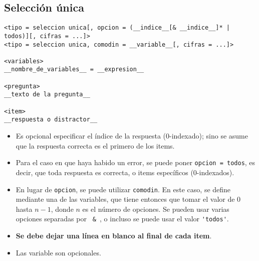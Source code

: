 \documentclass[12pt]{article}
\theoremstyle{definition}
\begin{document}
\subsection{Selección única}

\small
\begin{verbatim}
<tipo = seleccion unica[, opcion = (__indice__[& __indice__]* | todos)][, cifras = ...]>
<tipo = seleccion unica, comodin = __variable__[, cifras = ...]>

<variables>
__nombre_de_variables__ = __expresion__

<pregunta>
__texto de la pregunta__

<item>
__respuesta o distractor__

\end{verbatim}
\normalsize

\begin{itemize}
  \item Es opcional especificar el índice de la respuesta (0-indexado); sino se asume que la respuesta correcta es el primero de los items.
  \item Para el caso en que haya habido un error, se puede poner \verb|opcion = todos|, es decir, que toda respuesta es correcta, o items específicos (0-indexados).
  \item En lugar de \verb|opcion|, se puede utilizar \verb|comodin|. En este caso, se define mediante una de las variables, que tiene entonces que tomar el valor de 0 hasta $n-1$, donde $n$ es el n\'umero de opciones. Se pueden usar varias opciones separadas por \verb| & |, o incluso se puede usar el valor \verb|'todos'|.
  \item \textbf{Se debe dejar una línea en blanco al final de cada item}.
  \item Las variable son opcionales.
\end{itemize}


\end{document}
